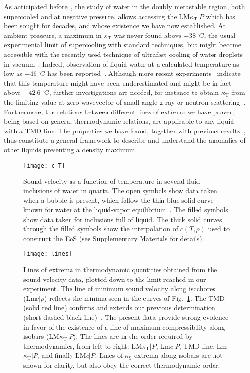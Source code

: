 \documentclass[12pt]{article}
\newcommand{\mrm}{\mathrm}
\newcommand{\degreeC}{\,^\circ\mathrm{C}}
\newcommand{\kT}{\kappa_\mrm{T}}
\newcommand{\kS}{\kappa_\mrm{S}}
\begin{document}
As anticipated before~\cite{Pallares_anomalies_2014,Caupin_escaping_2015}, the study of water in the doubly metastable region, both supercooled and at negative pressure, allows accessing the LM$\kT|P$ which has been sought for decades, and whose existence we have now established. At ambient pressure, a maximum in $\kT$ was never found above $-38\degreeC$, the usual experimental limit of supercooling with standard techniques, but might become accessible with the recently used technique of ultrafast cooling of water droplets in vacuum~\cite{Sellberg_ultrafast_2014}. Indeed, observation of liquid water at a calculated temperature as low as $-46\degreeC$ has been reported~\cite{Sellberg_ultrafast_2014}. Although more recent experiments~\cite{Goy_shrinking_2017} indicate that this temperature might have been underestimated and might be in fact above $-42.6\degreeC$, further investigations are needed, for instance to obtain $\kT$ from the limiting value at zero wavevector of small-angle x-ray or neutron scattering~\cite{Clark_smallangle_2010}. Furthermore, the relations between different lines of extrema we have proven, being based on general thermodynamic relations, are applicable to any liquid with a TMD line. The properties we have found, together with previous results~\cite{Sastry_singularityfree_1996,Poole_density_2005}, thus constitute a general framework to describe and understand the anomalies of other liquids presenting a density maximum.




\begin{figure}
\centerline{\texttt{[image: c-T]}}
\caption{Sound velocity as a function of temperature in several fluid inclusions of water in quartz. The open symbols show data taken when a bubble is present, which follow the thin blue solid curve known for water at the liquid-vapor equilibrium~\cite{Wagner_IAPWS_2002}. The filled symbols show data taken for inclusions full of liquid. The thick solid curves through the filled symbols show the interpolation of $c(T,\rho)$ used to construct the EoS\cite{Pallares_equation_2016} (see Supplementary Materials for details).}
\label{fig:c-T}
\end{figure}

\begin{figure}
\centerline{\texttt{[image: lines]}}\caption{Lines of extrema in thermodynamic quantities obtained from the sound velocity data, plotted down to the limit reached in our experiment. The line of minimum sound velocity along isochores (Lm$c|\rho$) reflects the minima seen in the curves of Fig.~\ref{fig:c-T}. The TMD (solid red line) confirms and extends our previous determination (short dashed black line)~\cite{Pallares_anomalies_2014}. The present data provide strong evidence in favor of the existence of a line of maximum compressibility along isobars (LM$\kT|P$). The lines are in the order required by thermodynamics, from left to right: LM$\kT|P$, Lm$c|P$, TMD line, Lm$\kT|P$, and finally LM$c|P$. Lines of $\kS$ extrema along isobars are not shown for clarity, but also obey the correct thermodynamic order.}
\label{fig:lines}
\end{figure}
\end{document}
